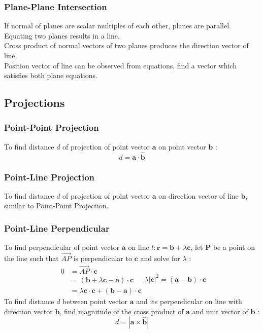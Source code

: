 \documentclass[../main]{subfiles}
\begin{document}
	\subsubsection{Plane-Plane Intersection}
	If normal of planes are scalar multiples of each other, planes are parallel. \\
	Equating two planes results in a line. \\ 
	Cross product of normal vectors of two planes produces the direction vector of line. \\ 
	Position vector of line can be observed from equations, find a vector which satisfies both plane equations. \\ 

\subsection{Projections}

	\subsubsection{Point-Point Projection}
	To find distance \(d\) of projection of point vector \(\mathbf{a}\) on point vector \(\mathbf{b}\) :
	\[ d = \mathbf{a} \cdot \mathbf{\hat{b}} \]
	\subsubsection{Point-Line Projection}
	To find distance \(d\) of projection of point vector \(\mathbf{a}\) on direction vector of line \(\mathbf{b}\), similar to Point-Point Projection.
	\subsubsection{Point-Line Perpendicular}
	To find perpendicular of point vector \(\mathbf{a}\) on line \(l: \mathbf{r} = \mathbf{b} + \lambda \mathbf{c}\), let \(\mathbf{P}\) be a point on the line such that \(\overrightarrow{AP}\) is perpendicular to \(\mathbf{c}\) and solve for \(\lambda\) : 
	\begin{equation*}
		\begin{split}
		0 & = \overrightarrow{AP} \cdot \mathbf{c} \\
		  & = (\mathbf{b} + \lambda \mathbf{c} - \mathbf{a} ) \cdot \mathbf{c} \\
		  & = \lambda \mathbf{c} \cdot \mathbf{c} + (\mathbf{b} - \mathbf{a}) \cdot \mathbf{c}
		\end{split}
		\lambda | \mathbf{c} |^2 = (\mathbf{a} - \mathbf{b}) \cdot \mathbf{c}
	\end{equation*}
	To find distance \(d\) between point vector \(\mathbf{a}\) and its perpendicular on line with direction vector \(\mathbf{b}\), find magnitude of the cross product of \(\mathbf{a}\) and unit vector of \(\mathbf{b}\) :
	\[ d = |\mathbf{a} \times \mathbf{\hat{b}}| \]
\end{document}
